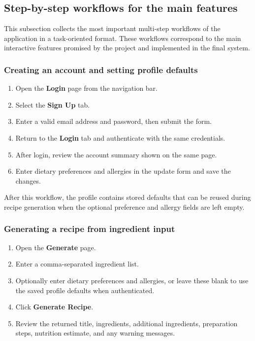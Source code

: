 \subsection{Step-by-step workflows for the main features}

This subsection collects the most important multi-step workflows of the
application in a task-oriented format. These workflows correspond to
the main interactive features promised by the project and implemented
in the final system.

\subsubsection{Creating an account and setting profile defaults}

\begin{enumerate}
	\item Open the \textbf{Login} page from the navigation bar.
	\item Select the \textbf{Sign Up} tab.
	\item Enter a valid email address and password, then submit the form.
	\item Return to the \textbf{Login} tab and authenticate with the same
	credentials.
	\item After login, review the account summary shown on the same page.
	\item Enter dietary preferences and allergies in the update form and
	save the changes.
\end{enumerate}

After this workflow, the profile contains stored defaults that can be
reused during recipe generation when the optional preference and
allergy fields are left empty.

\subsubsection{Generating a recipe from ingredient input}

\begin{enumerate}
	\item Open the \textbf{Generate} page.
	\item Enter a comma-separated ingredient list.
	\item Optionally enter dietary preferences and allergies, or leave
	these blank to use the saved profile defaults when authenticated.
	\item Click \textbf{Generate Recipe}.
	\item Review the returned title, ingredients, additional ingredients,
	preparation steps, nutrition estimate, and any warning messages.
\end{enumerate}

